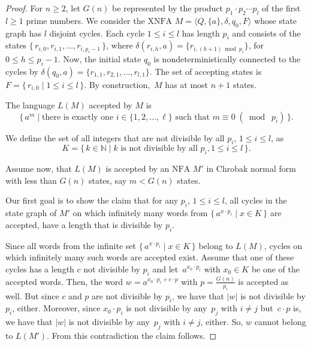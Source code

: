 \documentclass[final,copyright,noderivs]{eptcs}
\theoremstyle{plain}
\theoremstyle{definition}
\newcommand{\nfa}{\textrm{NFA}}
\newcommand{\xnfa}{\textrm{XNFA}}
\begin{document}
\begin{proof}
\begin{sloppypar}
For $n\geq 2$, let $G(n)$ be represented by the product $p_1\cdot p_2\cdots
p_l$ of the first $l\geq 1$ prime numbers.
We consider the $\xnfa$ $M=\langle Q,\{a\},\delta,q_0,F\rangle$ whose state
graph has $l$ disjoint cycles. Each cycle \mbox{$1\leq i\leq l$} has length $p_i$
and consists of the states 
$\{\, r_{i,0}, r_{i,1},\dots ,r_{i,p_i-1}\,\}$, where
\mbox{$\delta(r_{i,h},a)=\{r_{i,(h+1)\bmod p_i}\}$,} for \mbox{$0\leq h\leq p_i-1$.}
Now, the initial state $q_0$ is nondeterministically connected to the cycles
by \mbox{$\delta(q_0,a)=\{r_{1,1}, r_{2,1},\dots, r_{l,1}\}$.}
The set of accepting states is $F=\{\, r_{i,0}\mid 1\le i\le l\,\}$. 
By construction,~$M$ has at most $n+1$ states.
\end{sloppypar}

The language $L(M)$ accepted by $M$ is
$$
\{\,a^m \mid \text{there is exactly one } i\in\{1,2,\dots,\ell\} \text{ such
    that } m \equiv 0\; (\bmod\; p_i)\,\}.
$$

We define the set of all integers that are not divisible by all $p_i$, $1\leq
i\leq l$,
as 
$$
K=\{\, k\in \mathbb{N} \mid k \text{ is not divisible by all } p_i, 1\leq
i\leq l\,\}.
$$

Assume now, that $L(M)$ is accepted by an $\nfa$ $M'$ in Chrobak normal form with
less than $G(n)$ states, say $m< G(n)$ states. 

Our first goal is to show the claim that for any $p_i$, $1\leq i\leq l$, 
all cycles in the state graph of $M'$ on which infinitely
many words from $\{\,a^{x\cdot p_i} \mid x\in K \,\}$ are accepted,
have a length that is divisible by $p_i$.

Since all words from the infinite set $\{\,a^{x\cdot p_i} \mid x\in K \,\}$
belong to $L(M)$, cycles on which infinitely many such words are accepted
exist. Assume that one of these cycles has a length $c$ not divisible by $p_i$
and let~$a^{x_0\cdot p_i}$ with $x_0\in K$ be one of the accepted words.
Then, the word $w=a^{x_0\cdot p_i+ c\cdot p}$ with $p=\frac{G(n)}{p_i}$
is accepted as well.
%
But since $c$ and $p$ are not divisible by $p_i$, we have that $|w|$ is not
divisible by $p_i$, either. Moreover, since $x_0\cdot p_i$ is not divisible by any~$p_j$ with $i\neq j$
but~\mbox{$c\cdot p$} is, we have that $|w|$ is not divisible by any~$p_j$ with $i\neq j$, either.
So, $w$ cannot belong to $L(M')$. 
From this contradiction the claim follows.


\end{proof}
\end{document}
